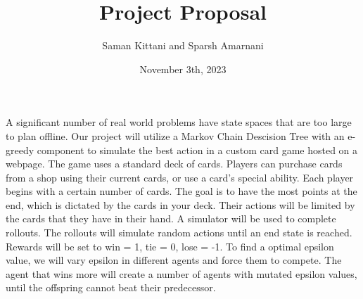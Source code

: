 \documentclass{article}
\title{Project Proposal}
\author{Saman Kittani and Sparsh Amarnani}
\date{November 3th, 2023}
\begin{document}
	\maketitle
	\newpage
	A significant number of real world problems have state spaces that are too large to plan offline. Our project will utilize a Markov Chain Descision Tree with an e-greedy component to simulate the best action in a custom card game hosted on a webpage. The game uses a standard deck of cards. Players can purchase cards from a shop using their current cards, or use a card's special ability. Each player begins with a certain number of cards. The goal is to have the most points at the end, which is dictated by the cards in your deck. Their actions will be limited by the cards that they have in their hand. A simulator will be used to complete rollouts. The rollouts will simulate random actions until an end state is reached. Rewards will be set to win = 1, tie = 0, lose = -1. To find a optimal epsilon value, we will vary epsilon in different agents and force them to compete. The agent that wins more will create a number of agents with mutated epsilon values, until the offspring cannot beat their predecessor.
\end{document}
